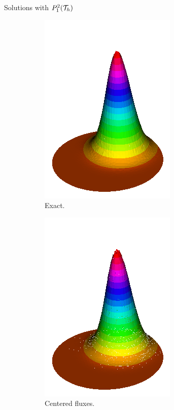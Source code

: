 		\begin{frame}{Solutions with $\relax{P}_1^2(\mathcal{T}_h)$}
		\vspace{-0.2cm}
		\begin{figure}[h!]
			\begin{subfigure}[b]{0.27\textwidth}
				\centering
				\includegraphics[scale=0.22]{img/Conveccion_Reaccion/Recortes/steady_convect_react_exact_n_128.png}
				\caption{Exact.}
			\end{subfigure}
			\begin{subfigure}[b]{0.27\textwidth}
				\centering
				\includegraphics[scale=0.22]{img/Conveccion_Reaccion/Recortes/steady_convect_react_approx_CF_n_128.png}
				\caption{Centered fluxes.}
			\end{subfigure}
			\begin{subfigure}[b]{0.27\textwidth}

\end{subfigure}
\end{figure}
\end{frame}

